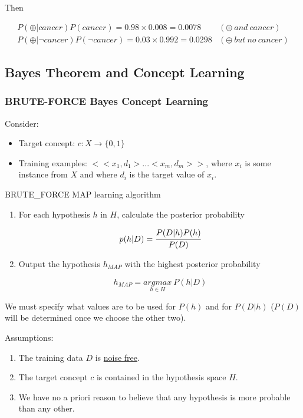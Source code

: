 Then

\begin{equation*}
\begin{aligned}
P(\oplus |cancer)P(cancer)=0.98\times0.008=0.0078&(\oplus\ and\ cancer)\\
P(\oplus|\neg cancer)P(\neg cancer)=0.03\times0.992=0.0298&(\oplus\ but\ no\ cancer)
\end{aligned}
\end{equation*}

\hypertarget{bayes-theorem-and-concept-learning}{%
\subsection{Bayes Theorem and Concept
Learning}\label{bayes-theorem-and-concept-learning}}

\hypertarget{brute-force-bayes-concept-learning}{%
\subsubsection{BRUTE-FORCE Bayes Concept
Learning}\label{brute-force-bayes-concept-learning}}

Consider:

\begin{itemize}
\item
  Target concept: \(c:X\rightarrow\{0,1\}\)
\item
  Training examples: \(<<x_1,d_1>...<x_m,d_m>>\), where \(x_i\) is some
  instance from \(X\) and where \(d_i\) is the target value of \(x_i\).
\end{itemize}

BRUTE\_FORCE MAP learning algorithm

\begin{enumerate}
\def\labelenumi{\arabic{enumi}.}
\item
  For each hypothesis \(h\) in \(H\), calculate the posterior
  probability

  \[p(h|D)=\cfrac{P(D|h)P(h)}{P(D)}\]
\item
  Output the hypothesis \(h_{MAP}\) with the highest posterior
  probability

  \[h_{MAP}=\underset{h\in H}{argmax}\ P(h|D)\]
\end{enumerate}

We must specify what values are to be used for \(P(h)\) and for
\(P(D|h)\) (\(P(D)\) will be determined once we choose the other two).

Assumptions:

\begin{enumerate}
\def\labelenumi{\arabic{enumi}.}
\item
  The training data \(D\) is \ul{noise free}.
\item
  The target concept \(c\) is contained in the hypothesis space \(H\).
\item
  We have no a priori reason to believe that any hypothesis is more
  probable than any other.
\end{enumerate}

